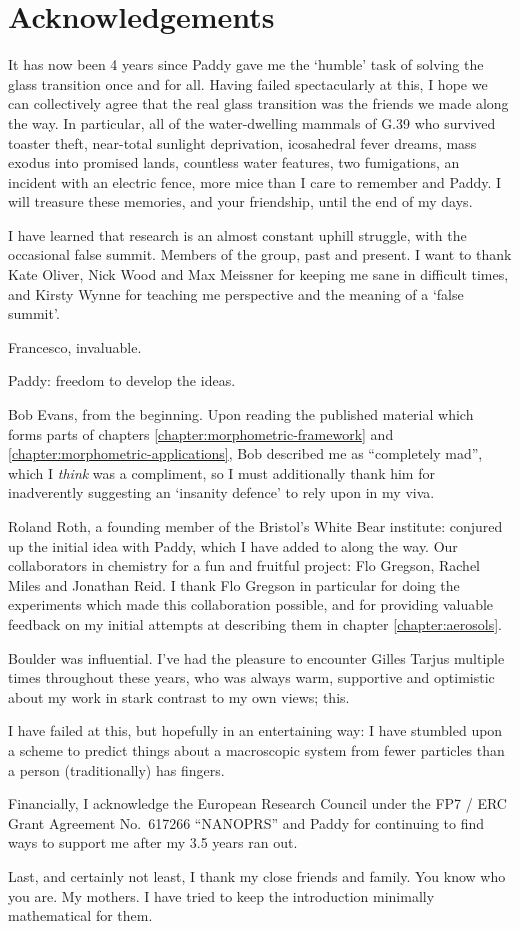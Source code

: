 
\chapter*{Acknowledgements}

It has now been 4 years since Paddy gave me the `humble' task of solving the glass transition once and for all.
Having failed spectacularly at this, I hope we can collectively agree that the real glass transition was the friends we made along the way.
In particular, all of the water-dwelling mammals of G.39 who survived toaster theft, near-total sunlight deprivation, icosahedral fever dreams, mass exodus into promised lands, countless water features, two fumigations, an incident with an electric fence, more mice than I care to remember and Paddy.
I will treasure these memories, and your friendship, until the end of my days.

I have learned that research is an almost constant uphill struggle, with the occasional false summit.
Members of the group, past and present.
I want to thank Kate Oliver, Nick Wood and Max Meissner for keeping me sane in difficult times, and Kirsty Wynne for teaching me perspective and the meaning of a `false summit'.

Francesco, invaluable.

Paddy: freedom to develop the ideas.

Bob Evans, from the beginning.
Upon reading the published material which forms parts of chapters \ref{chapter:morphometric-framework} and \ref{chapter:morphometric-applications}, Bob described me as ``completely mad'', which I \emph{think} was a compliment, so I must additionally thank him for inadverently suggesting an `insanity defence' to rely upon in my viva.

Roland Roth, a founding member of the Bristol's White Bear institute: conjured up the initial idea with Paddy, which I have added to along the way.
Our collaborators in chemistry for a fun and fruitful project: Flo Gregson, Rachel Miles and Jonathan Reid.
I thank Flo Gregson in particular for doing the experiments which made this collaboration possible, and for providing valuable feedback on my initial attempts at describing them in chapter \ref{chapter:aerosols}.

Boulder was influential.
I've had the pleasure to encounter Gilles Tarjus multiple times throughout these years, who was always warm, supportive and optimistic about my work in stark contrast to my own views; this.

I have failed at this, but hopefully in an entertaining way: I have stumbled upon a scheme to predict things about a macroscopic system from fewer particles than a person (traditionally) has fingers.

Financially, I acknowledge the European Research Council under the FP7 / ERC Grant Agreement No.\ 617266 ``NANOPRS'' and Paddy for continuing to find ways to support me after my 3.5 years ran out.

Last, and certainly not least, I thank my close friends and family.
You know who you are.
My mothers.
I have tried to keep the introduction minimally mathematical for them.

